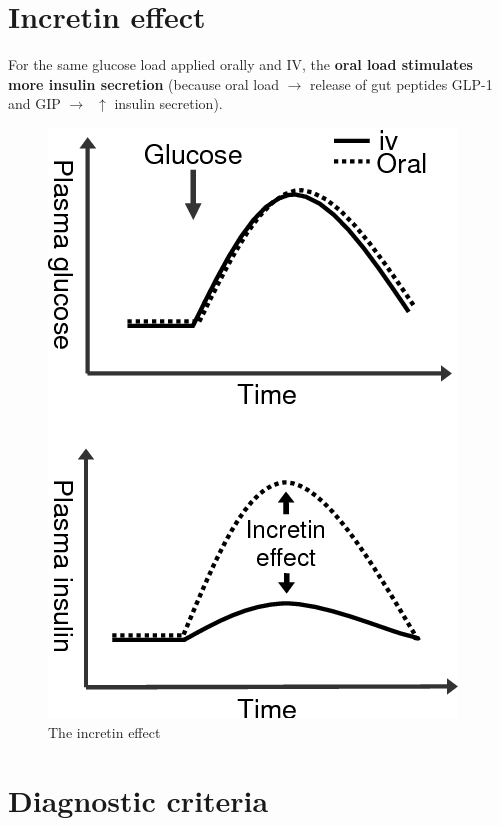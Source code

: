 \documentclass[
  12pt,
]{memoir}
\begin{document}
\hypertarget{incretin-effect}{%
\section{Incretin effect}\label{incretin-effect}}

For the same glucose load applied orally and IV, the \textbf{oral load
stimulates more insulin secretion} (because oral load \(\rightarrow\)
release of gut peptides GLP-1 and GIP \(\rightarrow\;\;\uparrow\)
insulin secretion).

\vfill

\begin{figure}[h!]
\centering
\includegraphics[width=.4\textwidth]{../assets/med/incretin.png}
\vspace{10mm}
\caption{The incretin effect}
\end{figure}

\hypertarget{diagnostic-criteria}{%
\section{Diagnostic criteria}\label{diagnostic-criteria}}
\end{document}
